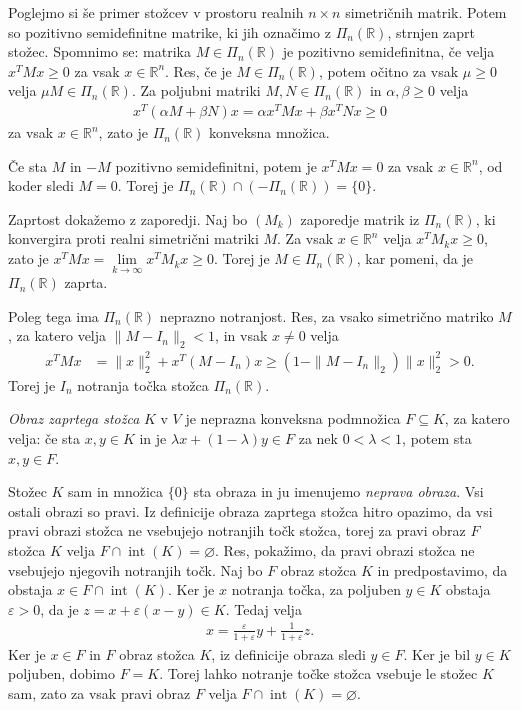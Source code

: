 \documentclass[mat2, tisk]{fmfdelo}
\newcommand{\R}{\mathbb{R}}
\begin{document}
\begin{zgled}
  Poglejmo si še primer stožcev v prostoru realnih $n \times n$ simetričnih matrik. 
  Potem so pozitivno semidefinitne matrike, ki jih označimo z $\Pi_n (\R)$, strnjen
  zaprt stožec. Spomnimo se: matrika $M\in \Pi_n(\R)$ je pozitivno semidefinitna,
  če velja $x^T M x\geq 0$ za vsak $x\in\R^n$. Res, če je $M \in \Pi_n (\R)$, 
  potem očitno za vsak $\mu \geq 0$ velja 
  $\mu M \in \Pi_n (\R)$. Za poljubni matriki $M,N\in\Pi_n(\R)$ in
  $\alpha,\beta\geq 0$ velja
  \begin{align*}
  x^T(\alpha M+\beta N)x
  =\alpha x^T M x+\beta x^T N x\geq 0
  \end{align*}
  za vsak $x\in\R^n$, zato je $\Pi_n(\R)$
  konveksna množica.

  Če sta $M$ in $-M$ pozitivno semidefinitni,
  potem je $x^T M x=0$ za vsak $x\in\R^n$,
  od koder sledi $M=0$. Torej je
  $\Pi_n(\R)\cap(-\Pi_n(\R))=\{0\}$.

  Zaprtost dokažemo z zaporedji. Naj bo
  $(M_k)$ zaporedje matrik iz $\Pi_n(\R)$,
  ki konvergira proti realni simetrični matriki $M$.
  Za vsak $x\in\R^n$ velja $x^T M_k x\geq 0$,
  zato je
  $x^T M x=\lim\limits_{k\to\infty}x^T M_k x\geq 0$.
  Torej je $M\in\Pi_n(\R)$, kar pomeni,
  da je $\Pi_n(\R)$ zaprta.

  Poleg tega ima $\Pi_n(\R)$ neprazno notranjost.
  Res, za vsako simetrično matriko $M$, za katero
  velja $\|M-I_n\|_2<1$, in vsak $x\neq 0$ velja
  \begin{align*}
  x^T M x
  &=\|x\|_2^2+x^T(M-I_n)x \geq (1-\|M-I_n\|_2)\|x\|_2^2>0.
  \end{align*}
  Torej je $I_n$ notranja točka stožca
  $\Pi_n(\R)$.
\end{zgled}

\begin{definicija}
  \emph{Obraz zaprtega stožca} $K$ v $V$ je neprazna konveksna podmnožica $F \subseteq K$, 
  za katero velja: če sta $x, y \in K$ in je $\lambda x + (1-\lambda)y \in F$ 
  za nek $0 < \lambda < 1$, potem sta $x, y \in F$. 
\end{definicija}

Stožec $K$ sam in množica $\{0\}$ sta obraza in ju imenujemo \emph{neprava obraza}. 
Vsi ostali obrazi so pravi. Iz definicije obraza zaprtega stožca hitro opazimo, da 
vsi pravi obrazi stožca ne vsebujejo notranjih točk stožca, torej za pravi obraz $F$ stožca $K$ 
velja $F \cap \operatorname{int}(K) = \varnothing$.
Res, pokažimo, da pravi obrazi stožca ne vsebujejo
njegovih notranjih točk. Naj bo $F$ obraz stožca
$K$ in predpostavimo, da obstaja
$x\in F\cap\operatorname{int}(K)$.
Ker je $x$ notranja točka, za poljuben $y\in K$
obstaja $\varepsilon>0$, da je
$z=x+\varepsilon(x-y)\in K$.
Tedaj velja
\begin{align*}
x=\frac{\varepsilon}{1+\varepsilon}y
+\frac{1}{1+\varepsilon}z.
\end{align*}
Ker je $x\in F$ in $F$ obraz stožca $K$,
iz definicije obraza sledi $y\in F$.
Ker je bil $y\in K$ poljuben, dobimo $F=K$.
Torej lahko notranje točke stožca vsebuje
le stožec $K$ sam, zato za vsak pravi obraz
$F$ velja
$F\cap\operatorname{int}(K)=\varnothing$.
\end{document}
